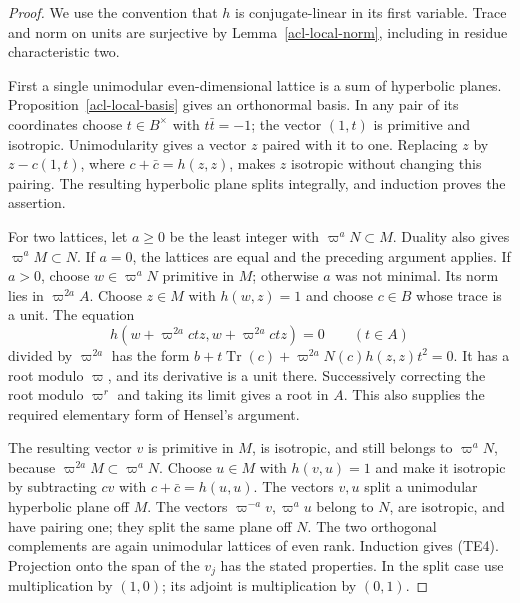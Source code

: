 \begin{proof}
We use the convention that $h$ is conjugate-linear in its
first variable.  Trace and norm on units are surjective by
Lemma~\ref{acl-local-norm}, including in residue
characteristic two.

First a single unimodular even-dimensional lattice is a
sum of hyperbolic planes.  Proposition~\ref{acl-local-basis}
gives an orthonormal basis.  In any pair of its coordinates
choose $t\in B^\times$ with $t\bar t=-1$; the vector
$(1,t)$ is primitive and isotropic.  Unimodularity gives
a vector $z$ paired with it to one.  Replacing $z$ by
$z-c(1,t)$, where $c+\bar c=h(z,z)$, makes $z$ isotropic
without changing this pairing.  The resulting hyperbolic
plane splits integrally, and induction proves the assertion.

For two lattices, let $a\geq0$ be the least integer with
$\varpi^aN\subset M$.  Duality also gives
$\varpi^aM\subset N$.  If $a=0$, the lattices are equal
and the preceding argument applies.  If $a>0$, choose
$w\in\varpi^aN$ primitive in $M$; otherwise $a$ was not
minimal.  Its norm lies in $\varpi^{2a}A$.
Choose $z\in M$ with $h(w,z)=1$ and choose $c\in B$
whose trace is a unit.  The equation
\[
 h(w+\varpi^{2a}ctz,w+\varpi^{2a}ctz)=0
                    \qquad(t\in A)
 \tag{TE5}
\]
divided by $\varpi^{2a}$ has the form
$b+t\operatorname{Tr}(c)+\varpi^{2a}N(c)h(z,z)t^2=0$.
It has a root modulo $\varpi$, and its derivative is a
unit there.  Successively correcting the root modulo
$\varpi^r$ and taking its limit gives a root in $A$.
This also supplies the required elementary form of
Hensel's argument.

The resulting vector $v$ is primitive in $M$, is isotropic,
and still belongs to $\varpi^aN$, because
$\varpi^{2a}M\subset\varpi^aN$.
Choose $u\in M$ with $h(v,u)=1$ and make it isotropic
by subtracting $cv$ with $c+\bar c=h(u,u)$.
The vectors $v,u$ split a unimodular hyperbolic plane
off $M$.  The vectors $\varpi^{-a}v,\varpi^a u$
belong to $N$, are isotropic, and have pairing one;
they split the same plane off $N$.
The two orthogonal complements are again unimodular
lattices of even rank.  Induction gives (TE4).
Projection onto the span of the $v_j$ has the stated
properties.  In the split case use multiplication by
$(1,0)$; its adjoint is multiplication by $(0,1)$.
\end{proof}

